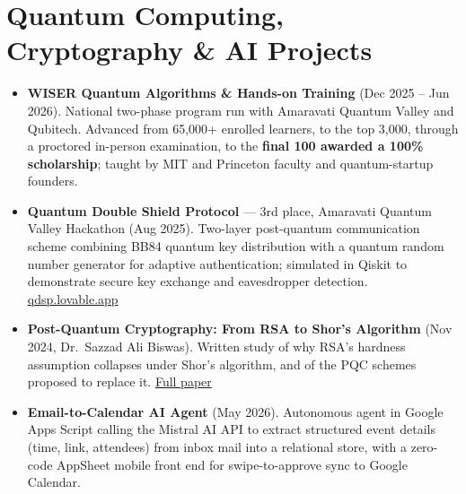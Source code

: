 \documentclass[a4paper,10pt]{article}
\begin{document}
\section*{Quantum Computing, Cryptography \& AI Projects}
\begin{itemize}
    \item \textbf{WISER Quantum Algorithms \& Hands-on Training} (Dec 2025 -- Jun 2026). National two-phase program
          run with Amaravati Quantum Valley and Qubitech. Advanced from 65,000+ enrolled learners, to the top 3,000,
          through a proctored in-person examination, to the \textbf{final 100 awarded a 100\% scholarship}; taught by
          MIT and Princeton faculty and quantum-startup founders.
    \item \textbf{Quantum Double Shield Protocol} --- 3rd place, Amaravati Quantum Valley Hackathon (Aug 2025).
          Two-layer post-quantum communication scheme combining BB84 quantum key distribution with a quantum random
          number generator for adaptive authentication; simulated in Qiskit to demonstrate secure key exchange and
          eavesdropper detection. \href{https://qdsp.lovable.app/}{qdsp.lovable.app}
    \item \textbf{Post-Quantum Cryptography: From RSA to Shor's Algorithm} (Nov 2024, Dr.\ Sazzad Ali Biswas).
          Written study of why RSA's hardness assumption collapses under Shor's algorithm, and of the PQC schemes
          proposed to replace it. \href{https://drive.google.com/file/d/1fDQ5HvPlZYr21C-wEio_WIuogFJ1aVdB/view}{Full paper}
    \item \textbf{Email-to-Calendar AI Agent} (May 2026). Autonomous agent in Google Apps Script calling the Mistral
          AI API to extract structured event details (time, link, attendees) from inbox mail into a relational store,
          with a zero-code AppSheet mobile front end for swipe-to-approve sync to Google Calendar.
\end{itemize}

\end{document}
